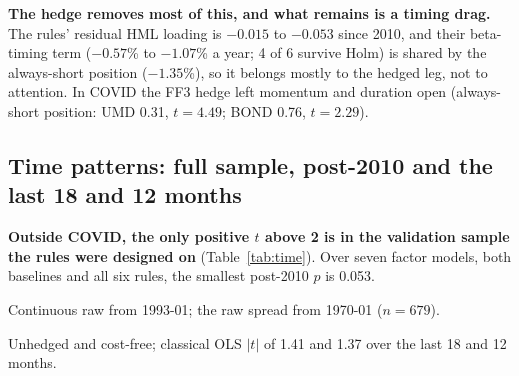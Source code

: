 \textbf{The hedge removes most of this, and what remains is a timing drag.} The rules' residual HML loading is $-0.015$ to $-0.053$ since 2010, and their \citet{ln2006} beta-timing term ($-0.57$\% to $-1.07$\% a year; 4 of 6 survive Holm) is shared by the always-short position ($-1.35$\%), so it belongs mostly to the hedged leg, not to attention. In COVID the FF3 hedge left momentum and duration open (always-short position: UMD 0.31, $t=4.49$; BOND 0.76, $t=2.29$).

\subsection{Time patterns: full sample, post-2010 and the last 18 and 12 months}
\label{sec:time}

\textbf{Outside COVID, the only positive $t$ above 2 is in the validation sample the rules were designed on} (Table~\ref{tab:time}). Over seven factor models, both baselines and all six rules, the smallest post-2010 $p$ is 0.053.

\begin{table}[!htb]
\caption{Time patterns. Net return and FF3 alpha (\% a year, NW(6) $t$) of three corrected-baseline rules, the always-short position and the raw GB spread. Under $t(n-4)$, 18 and 12 months need $|t|$ above 2.14 and 2.31. Wherever the rules gain, the always-short position earns at least two-thirds of the best rule's return.}
\label{tab:time}
\centering\scriptsize
\setlength{\tabcolsep}{4.5pt}
\begin{threeparttable}

\begin{tablenotes}\scriptsize
\item[a] Continuous raw from 1993-01; the raw spread from 1970-01 ($n=679$). \item[b] Unhedged and cost-free; classical OLS $|t|$ of 1.41 and 1.37 over the last 18 and 12 months.
\end{tablenotes}
\end{threeparttable}
\end{table}


